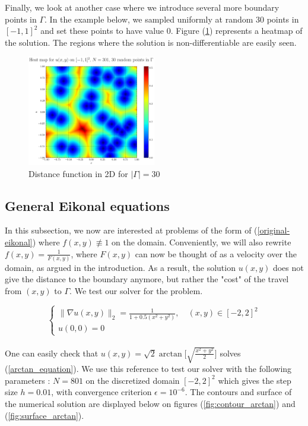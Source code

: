 \documentclass[11pt]{article}
\theoremstyle{definition}
\theoremstyle{remark}
\begin{document}
\FloatBarrier

\noindent Finally, we look at another case where we introduce several more boundary points in $\Gamma$. In the example below, we sampled uniformly at random 30 points in $[-1,1]^2$ and set these points to have value 0. Figure (\ref{fig:heatmap30random}) represents a heatmap of the solution. The regions where the solution is non-differentiable are easily seen.

\begin{figure}[h!]
  \centering
  \includegraphics[width=0.5\textwidth]{plots/heatmap_random30.png}
  \caption{Distance function in 2D for $|\Gamma|=30$}
  \label{fig:heatmap30random}
\end{figure}

\newpage

\subsection{General Eikonal equations}
In this subsection, we now are interested at problems of the form of (\ref{original-eikonal}) where $f(x,y)\not\equiv 1$ on the domain. Conveniently, we will also rewrite $f(x,y)=\frac{1}{F(x,y)}$, where $F(x,y)$ can now be thought of as a velocity over the domain, as argued in the introduction. As a result, the solution $u(x,y)$ does not give the distance to the boundary anymore, but rather the "cost" of the travel from $(x,y)$ to $\Gamma$.
We test our solver for the problem.

\begin{equation}
\label{arctan_equation}
    \begin{cases}
        \|\nabla u(x,y)\|_2=\frac{1}{1+0.5(x^2+y^2)} , \quad(x,y) \in [-2,2]^2 \\
        u(0,0)= 0
    \end{cases}
\end{equation} \\

One can easily check that $u(x,y)=\sqrt{2}\arctan\Big[\sqrt{\frac{x^2+y^2}{2}}\Big]$ solves (\ref{arctan_equation}). We use this reference to test our solver with the following parameters : $N=801$ on the discretized domain $[-2,2]^2$ which gives the step size $h=0.01$, with convergence criterion $\epsilon=10^{-6}$. The contours and surface of the numerical solution are displayed below on figures (\ref{fig:contour_arctan}) and (\ref{fig:surface_arctan}). \\
\end{document}
